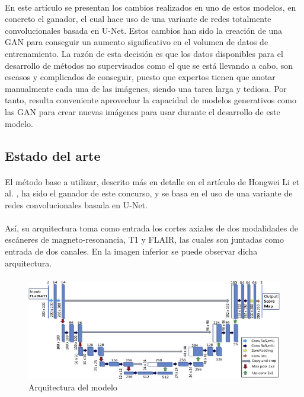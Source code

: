 \documentclass[12pt]{article}
\begin{document}
	\paragraph{}
	En este artículo se presentan los cambios realizados en uno de estos modelos, en concreto el ganador, el cual hace uso de una variante de redes totalmente convolucionales basada en U-Net. Estos cambios han sido la creación de una GAN para conseguir un aumento significativo en el volumen de datos de entrenamiento. La razón de esta decisión es que los datos disponibles para el desarrollo de métodos no supervisados como el que se está llevando a cabo, son escasos y complicados de conseguir, puesto que expertos tienen que anotar manualmente cada una de las imágenes, siendo una tarea larga y tediosa. Por tanto, resulta conveniente aprovechar la capacidad de modelos generativos como las GAN para crear nuevas imágenes para usar durante el desarrollo de este modelo.
	
	\subsection{Estado del arte}

	\paragraph{}
	El método base a utilizar, descrito más en detalle en el artículo de Hongwei Li et al. \cite{Fully convolutional network ensembles for white matter hyperintensities segmentation in MR images}, ha sido el ganador de este concurso, y se basa en el uso de una variante de redes convolucionales basada en U-Net.
	
	\paragraph{}
	Así, su arquitectura toma como entrada los cortes axiales de dos modalidades de escáneres de magneto-resonancia, T1 y FLAIR, las cuales son juntadas como entrada de dos canales. En la imagen inferior se puede observar dicha arquitectura.
	
	\paragraph{}
	
	\begin{figure}[h!]
	\centering
		\includegraphics[width=\linewidth]{img1.jpg}
		\caption[\textit{Arquitectura del modelo}]{Arquitectura del modelo}
		\label{fig:FCC}
	\end{figure}
\end{document}
